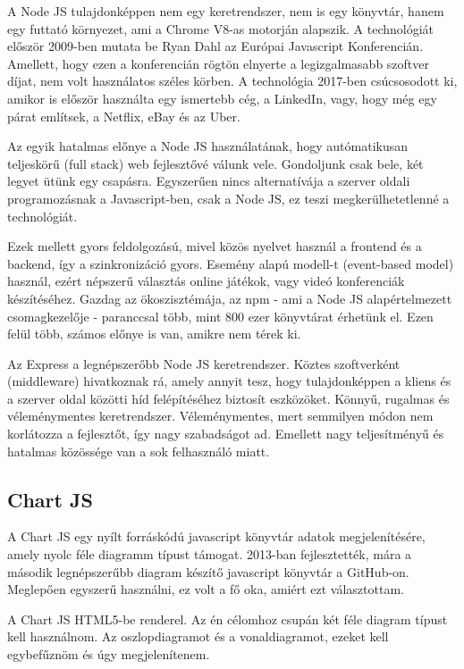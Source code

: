 A Node JS tulajdonképpen nem egy keretrendszer, nem is egy könyvtár, hanem egy futtató környezet, ami a Chrome V8-as motorján alapszik. A technológiát először 2009-ben mutata be Ryan Dahl az Európai Javascript Konferencián. Amellett, hogy ezen a konferencián rögtön elnyerte a legizgalmasabb szoftver díjat, nem volt használatos széles körben. A technológia 2017-ben csúcsosodott ki, amikor is először használta egy ismertebb cég, a LinkedIn, vagy, hogy még egy párat említsek, a Netflix, eBay és az Uber.

Az egyik hatalmas előnye a Node JS használatának, hogy autómatikusan teljeskörű (full stack) web fejlesztővé válunk vele. Gondoljunk csak bele, két legyet ütünk egy csapásra. Egyszerűen nincs alternatívája a szerver oldali programozásnak a Javascript-ben, csak a Node JS, ez teszi megkerülhetetlenné a technológiát.

Ezek mellett gyors feldolgozású, mivel közös nyelvet használ a frontend és a backend, így a szinkronizáció gyors. Esemény alapú modell-t (event-based model) használ, ezért népszerű választás online játékok, vagy videó konferenciák készítéséhez. Gazdag az ökoszisztémája, az npm - ami a Node JS alapértelmezett csomagkezelője - paranccsal több, mint 800 ezer könyvtárat érhetünk el. Ezen felül több, számos előnye is van, amikre nem térek ki.

Az Express a legnépszerőbb Node JS keretrendszer. Köztes szoftverként (middleware) hivatkoznak rá, amely annyit tesz, hogy tulajdonképpen a kliens és a szerver oldal közötti híd felépítéséhez biztosít eszközöket. Könnyű, rugalmas és véleménymentes keretrendszer. Véleménymentes, mert semmilyen módon nem korlátozza a fejlesztőt, így nagy szabadságot ad. Emellett nagy teljesítményű és hatalmas közössége van a sok felhasználó miatt.
\cite{node}

\subsection{Chart JS}
A Chart JS egy nyílt forráskódú javascript könyvtár adatok megjelenítésére, amely nyolc féle diagramm típust támogat. 2013-ban fejlesztették, mára a második legnépszerűbb diagram készítő javascript könyvtár a GitHub-on. Meglepően egyszerű használni, ez volt a fő oka, amiért ezt választottam. 

A Chart JS HTML5-be renderel. Az én célomhoz csupán két féle diagram típust kell használnom. Az oszlopdiagramot és a vonaldiagramot, ezeket kell egybefűznöm és úgy megjelenítenem.
\cite{chartjs}

